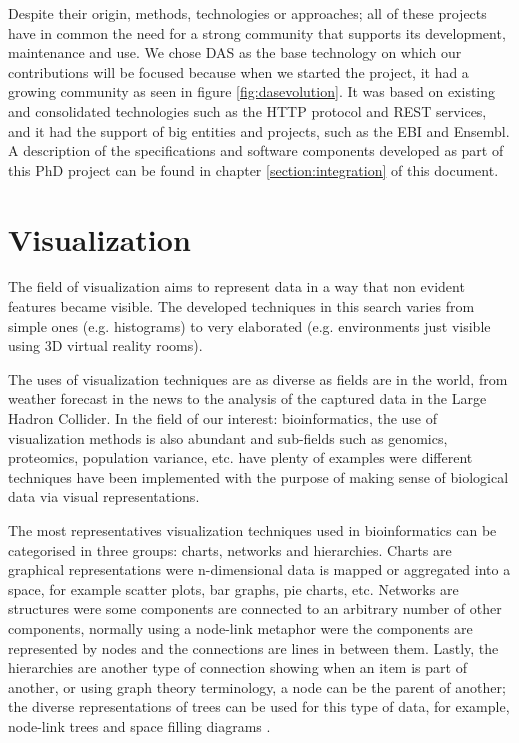 Despite their origin, methods, technologies or approaches; all of these projects have in common the need for a strong community that supports its development, maintenance and use. We chose DAS as the base technology on which our contributions will be focused because when we started the project, it had a growing community as seen in figure \ref{fig:dasevolution}. It was based on existing and consolidated technologies such as the HTTP protocol and REST services, and it had the support of big entities and projects, such as the EBI and Ensembl. A description of the specifications and software components developed as part of this PhD project can be found in chapter \ref{section:integration} of this document.

\newpage
\section{Visualization}
The field of visualization aims to represent data in a way that non evident features became visible. The developed techniques in this search varies from simple ones (e.g. histograms) to very elaborated (e.g. environments just visible using 3D virtual reality rooms).

The uses of visualization techniques are as diverse as fields are in the world, from weather forecast in the news to the analysis of the captured data in the Large Hadron Collider. In the field of our interest: bioinformatics, the use of visualization methods is also abundant and sub-fields such as genomics, proteomics, population variance, etc. have plenty of examples were different techniques have been implemented with the purpose of making sense of biological data via visual representations.

The most representatives visualization techniques used in bioinformatics can be categorised in three groups: charts, networks and hierarchies. Charts are graphical representations were n-dimensional data is mapped or aggregated into a space, for example scatter plots, bar graphs, pie charts, etc. Networks are structures were some components are connected to an arbitrary number of other components, normally using a node-link metaphor were the components are represented by nodes and the connections are lines in between them. Lastly, the hierarchies are another type of connection showing when an item is part of another, or using graph theory terminology, a node can be the parent of another; the diverse representations of trees can be used for this type of data, for example, node-link trees and space filling diagrams \cite{WAN2014}. 


